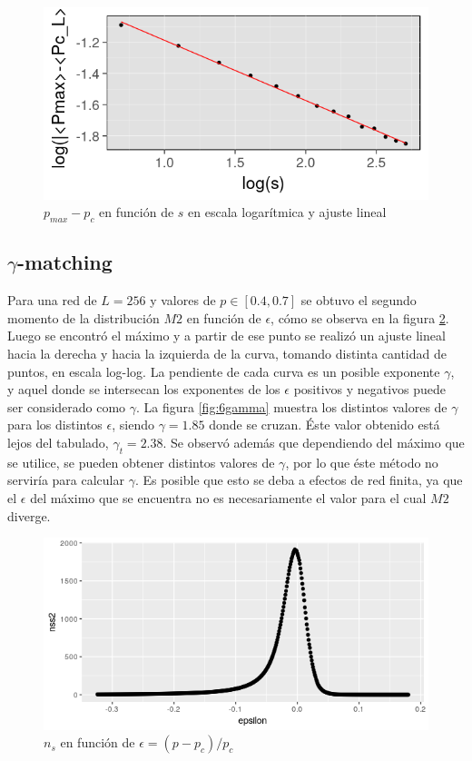 \documentclass[%
 reprint,
 amsmath,amssymb,
 aps,
spanish]{revtex4-1}
\begin{document}
\begin{figure}[h]
  \centering
  \includegraphics[width=.9\linewidth]{ej5/sigma}
\caption{$p_{max}-p_c$ en función de $s$ en escala logarítmica y ajuste lineal}
\label{fig:5sigma}
\end{figure}


\subsection{\label{6} $\gamma$-matching}
Para una red de $L=256$ y valores de $p\in[0.4, 0.7]$ se obtuvo el segundo momento de la distribución $M2$ en función de $\epsilon$, cómo se observa en la figura \ref{fig:6m2}. Luego se encontró el máximo y a partir de ese punto se realizó un ajuste lineal hacia la derecha y hacia la izquierda de la curva, tomando distinta cantidad de puntos, en escala log-log. La pendiente de cada curva es un posible exponente $\gamma$, y aquel donde se intersecan los exponentes de los $\epsilon$ positivos y negativos puede ser considerado como $\gamma$. La figura \ref{fig:6gamma} muestra los distintos valores de $\gamma$ para los distintos $\epsilon$, siendo $\gamma=1.85$ donde se cruzan. Éste valor obtenido está lejos del tabulado, $\gamma_t=2.38$. Se observó además que dependiendo del máximo que se utilice, se pueden obtener distintos valores de $\gamma$, por lo que éste método no serviría para calcular $\gamma$. Es posible que esto se deba a efectos de red finita, ya que el $\epsilon$ del máximo que se encuentra no es necesariamente el valor para el cual $M2$ diverge.

\begin{figure}[h]
  \centering
  \includegraphics[width=.9\linewidth]{ej6/m2}
\caption{$n_s$ en función de $\epsilon=(p-p_c)/p_c$}
\label{fig:6m2}
\end{figure}
\end{document}
